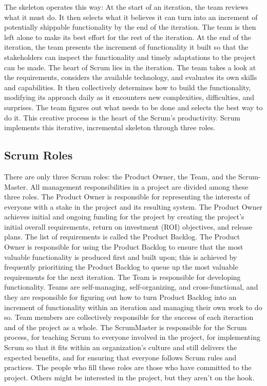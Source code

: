 The skeleton operates this way: At the start of an iteration, the team reviews what it must do. It then selects what it believes it can turn into an increment of potentially shippable functionality by the end of the iteration. The team is then left alone to make its best effort for the rest of the iteration. At the end of the iteration, the team presents the increment of functionality it built so that the stakeholders can inspect the functionality and timely adaptations to the project can be made. The heart of Scrum lies in the iteration. The team takes a look at the requirements, considers the available technology, and evaluates its own skills and capabilities. It then collectively determines how to build the functionality, modifying its approach daily as it encounters new complexities, difficulties, and surprises. The team figures out what needs to be done and selects the best way to do it. This creative process is the heart of the Scrum’s productivity. Scrum implements this iterative, incremental skeleton through three roles. 

\subsection{Scrum Roles}

There are only three Scrum roles: the Product Owner, the Team, and the Scrum-Master. All management responsibilities in a project are divided among these three roles. The Product Owner is responsible for representing the interests of everyone with a stake in the project and its resulting system. The Product Owner achieves initial and ongoing funding for the project by creating the project’s initial overall requirements, return on investment (ROI) objectives, and release plans. The list of requirements is called the Product Backlog. The Product Owner is responsible for using the Product Backlog to ensure that the most valuable functionality is produced first and built upon; this is achieved by frequently prioritizing the Product Backlog to queue up the most valuable requirements for the next iteration. The Team is responsible for developing functionality. Teams are self-managing, self-organizing, and cross-functional, and they are responsible for figuring out how to turn Product Backlog into an increment of functionality within an iteration and managing their own work to do so. Team members are collectively responsible for the success of each iteraction and of the project as a whole. The ScrumMaster is responsible for the Scrum process, for teaching Scrum to everyone involved in the project, for implementing Scrum so that it fits within an organization’s culture and still delivers the expected benefits, and for ensuring that everyone follows Scrum rules and practices. The people who fill these roles are those who have committed to the project. Others might be interested in the project, but they aren’t on the hook.


